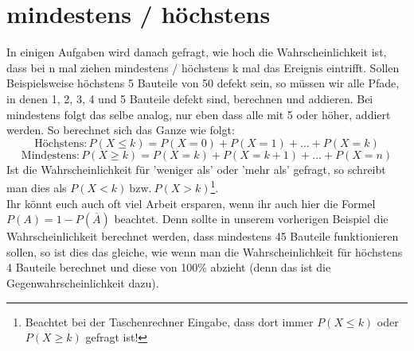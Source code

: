 \section{mindestens / höchstens}
	In einigen Aufgaben wird danach gefragt, wie hoch die Wahrscheinlichkeit ist,
	dass bei n mal ziehen mindestens / höchstens k mal das Ereignis eintrifft.
	Sollen Beispielsweise höchstens 5 Bauteile von 50 defekt sein, so müssen wir
	alle Pfade, in denen 1, 2, 3, 4 und 5 Bauteile defekt sind, berechnen und
	addieren. Bei mindestens folgt das selbe analog, nur eben dass alle mit 5 oder
	höher, addiert werden. So berechnet sich das Ganze wie folgt:
	\[\mathrm{\underline{Höchstens}: }P(X\leq k)=P(X=0)+P(X=1)+\ldots +P(X=k)\]
	\[\mathrm{\underline{Mindestens}: }P(X\geq k)=P(X=k)+P(X=k+1)+\ldots +P(X=n)\]
	Ist die Wahrscheinlichkeit für 'weniger als' oder 'mehr als' gefragt, so
	schreibt man dies als \(P(X<k)\mathrm{\ bzw.\ }P(X>k)\)\footnote{Beachtet bei
	der Taschenrechner Eingabe, dass dort immer $P(X\leq k)$ oder $P(X\geq k)$
	gefragt ist!}.\\
	Ihr könnt euch auch oft viel Arbeit ersparen, wenn ihr auch hier die Formel
	\(P(A)=1-P(\overline{A})\) beachtet. Denn sollte in unserem vorherigen Beispiel
	die Wahrscheinlichkeit berechnet werden, dass mindestens 45 Bauteile
	funktionieren sollen, so ist dies das gleiche, wie wenn man die
	Wahrscheinlichkeit für höchstens 4 Bauteile berechnet und diese von 100\%
	abzieht (denn das ist die Gegenwahrscheinlichkeit dazu).
